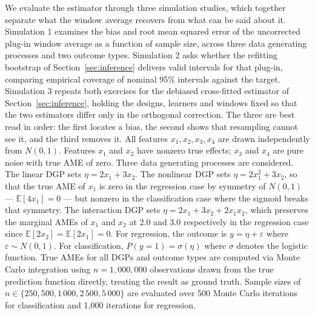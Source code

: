 \documentclass[12pt]{article}
\begin{document}
	We evaluate the estimator through three simulation studies, which together separate what the window average recovers from what can be said about it. Simulation 1 examines the bias and root mean squared error of the uncorrected plug-in window average as a function of sample size, across three data generating processes and two outcome types. Simulation 2 asks whether the refitting bootstrap of Section~\ref{sec:inference} delivers valid intervals for that plug-in, comparing empirical coverage of nominal 95\% intervals against the target. Simulation 3 repeats both exercises for the debiased cross-fitted estimator of Section~\ref{sec:inference}, holding the designs, learners and windows fixed so that the two estimators differ only in the orthogonal correction. The three are best read in order: the first locates a bias, the second shows that resampling cannot see it, and the third removes it. All features $x_1, x_2, x_3, x_4$ are drawn independently from $N(0,1)$. Features $x_1$ and $x_2$ have nonzero true effects; $x_3$ and $x_4$ are pure noise with true AME of zero. Three data generating processes are considered. The linear DGP sets $\eta = 2x_1 + 3x_2$. The nonlinear DGP sets $\eta = 2x_1^2 + 3x_2$, so that the true AME of $x_1$ is zero in the regression case by symmetry of $N(0,1)$ --- $\mathbb{E}[4x_1] = 0$ --- but nonzero in the classification case where the sigmoid breaks that symmetry. The interaction DGP sets $\eta = 2x_1 + 3x_2 + 2x_1 x_2$, which preserves the marginal AMEs of $x_1$ and $x_2$ at 2.0 and 3.0 respectively in the regression case since $\mathbb{E}[2x_2] = \mathbb{E}[2x_1] = 0$. For regression, the outcome is $y = \eta + \varepsilon$ where $\varepsilon \sim N(0,1)$. For classification, $P(y=1) = \sigma(\eta)$ where $\sigma$ denotes the logistic function. True AMEs for all DGPs and outcome types are computed via Monte Carlo integration using $n = 1{,}000{,}000$ observations drawn from the true prediction function directly, treating the result as ground truth. Sample sizes of $n \in \{250, 500, 1\,000, 2\,500, 5\,000\}$ are evaluated over 500 Monte Carlo iterations for classification and 1{,}000 iterations for regression.
	
\end{document}

